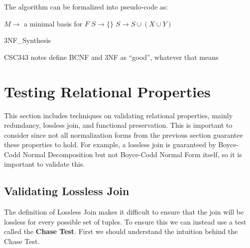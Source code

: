 \documentclass{report}
\begin{document}
    The algorithm can be formalized into pseudo-code as:
\vspace{.5cm}
 
    \begin{algorithm}[H]
        \vspace{.2cm}
        \SetAlgoLined
        \SetNoFillComment
        $M \rightarrow $ a minimal basis for $F$\;
        $S \rightarrow \{\}$ 
         {
            $S \rightarrow S \cup (X\cup Y)$ 
        }
        \caption{3NF\_Synthesis}
    \end{algorithm}
    \vspace{.5cm}
    
\begin{note}
    CSC343 notes define BCNF and 3NF as ``good'', whatever that means \shrug
\end{note}

\section{Testing Relational Properties}
This section includes techniques on validating relational properties, mainly redundancy, lossless join, and functional preservation. This is important to consider since not all normalization forms from the previous section guarantee these properties to hold. For example, a lossless join is guaranteed by Boyce-Codd Normal Decomposition but not Boyce-Codd Normal Form itself, so it is important to validate this.

\subsection{Validating Lossless Join}
The definition of Lossless Join makes it difficult to ensure that the join will be lossless for every possible set of tuples. To ensure this we can instead use a test called the \textbf{Chase Test}. First we should understand the intuition behind the Chase Test.
\vspace{.5cm}
 
\end{document}
